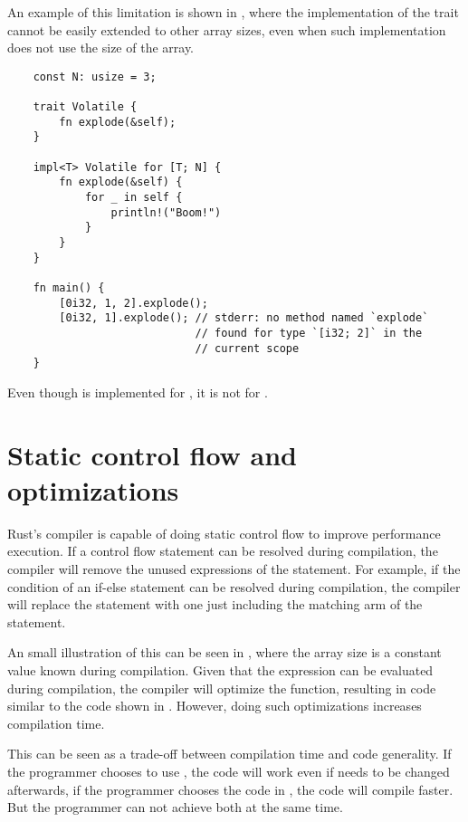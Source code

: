 An example of this limitation is shown in , where the
implementation of the trait  cannot be easily extended to
other array sizes, even when such implementation does not use the size of the
array. 

\begin{listing}
	\begin{verbatim} 
    const N: usize = 3;

    trait Volatile {
        fn explode(&self);
    }

    impl<T> Volatile for [T; N] {
        fn explode(&self) {
            for _ in self {
                println!("Boom!")
            }
        }
    }

    fn main() {
        [0i32, 1, 2].explode(); 
        [0i32, 1].explode(); // stderr: no method named `explode` 
                             // found for type `[i32; 2]` in the
                             // current scope
    }
	\end{verbatim}
    \caption{Even though  is implemented for \inrust{[T; 3]}, it is not for \inrust{[T; 2]}.}
  \label{lst:trait_array}
\end{listing}

\section{Static control flow and optimizations}
Rust's compiler is capable of doing static control flow to improve performance
execution. If a control flow statement can be resolved during compilation, the
compiler will remove the unused expressions of the statement. For example, if
the condition of an if-else statement can be resolved during compilation, the
compiler will replace the statement with one just including the matching arm of
the statement.

An small illustration of this can be seen in ,
where the array size  is a constant value known during compilation.
Given that the expression   can be evaluated during compilation,
the compiler will optimize the function, resulting in code similar to the code
shown in . However, doing such optimizations increases
compilation time. 

This can be seen as a trade-off between compilation time and code generality.
If the programmer chooses to use , the code will
work even if  needs to be changed afterwards, if the programmer
chooses the code in , the code will compile faster. But the
programmer can not achieve both at the same time.

